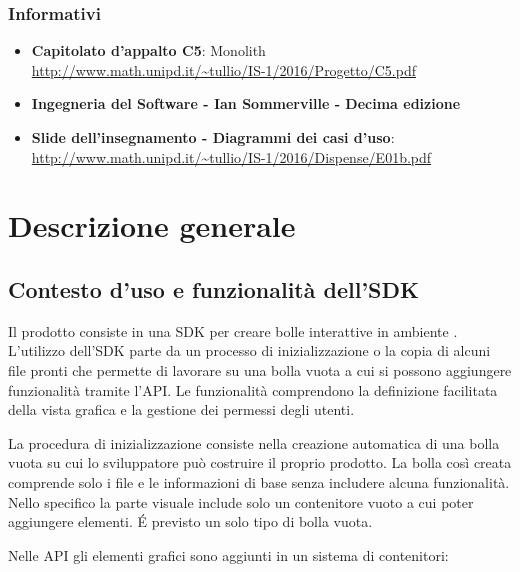 \subsubsection{Informativi}
\begin{itemize}
\item
  \textbf{Capitolato d'appalto C5}: Monolith \\
  \url{http://www.math.unipd.it/~tullio/IS-1/2016/Progetto/C5.pdf}
\item \textbf{Ingegneria del Software - Ian Sommerville - Decima edizione}
\item \textbf{Slide dell’insegnamento - Diagrammi dei casi d’uso}:
  \\ \url{http://www.math.unipd.it/~tullio/IS-1/2016/Dispense/E01b.pdf}

\end{itemize}


\section{Descrizione generale}
\subsection{Contesto d'uso e funzionalità dell'SDK}

Il prodotto consiste in una SDK per creare bolle interattive
in ambiente .
L'utilizzo dell'SDK parte da un processo di inizializzazione 
o la copia di alcuni file pronti che permette di lavorare su
una bolla vuota a cui si possono aggiungere funzionalità tramite
l'API.
Le funzionalità comprendono la definizione facilitata della vista
grafica e la gestione dei permessi degli utenti.

La procedura di inizializzazione consiste nella creazione automatica di una bolla
vuota su cui lo sviluppatore può costruire il proprio prodotto.
La bolla così creata comprende solo i file e le informazioni di base
senza includere alcuna funzionalità. Nello specifico la parte visuale include
solo un contenitore vuoto a cui poter aggiungere elementi.
\'E previsto un solo tipo di bolla vuota.



Nelle API gli elementi grafici sono aggiunti in un sistema di contenitori:

